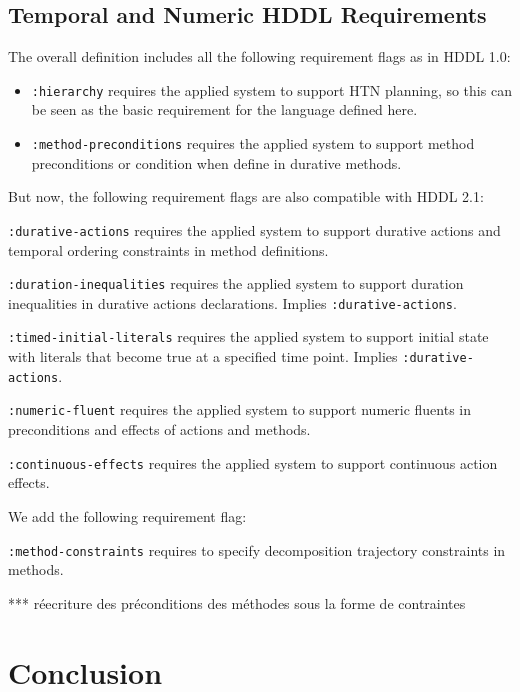 \documentclass[letterpaper]{article} %
\begin{document}
\subsection{Temporal and Numeric HDDL Requirements}
\label{Sec:Requirements}
The overall definition includes all the following requirement flags as in HDDL 1.0:
\begin{itemize}
 \item \verb+:hierarchy+ requires the applied system to support HTN planning, so this can be seen as the basic requirement for the language defined here.
 \item \verb+:method-preconditions+ requires the applied system to support method preconditions or condition when define in durative methods.
\end{itemize}
But now, the following requirement flags are also compatible with HDDL 2.1:
\begin{description}
 \item \verb+:durative-actions+ requires the applied system to support durative actions and temporal ordering constraints in method definitions.
 \item \verb+:duration-inequalities+ requires the applied system to support duration inequalities in durative actions declarations. Implies \verb+:durative-actions+.
 \item \verb+:timed-initial-literals+ requires the applied system to support initial state with literals that become true at a specified time point. Implies \verb+:durative-actions+.
 \item \verb+:numeric-fluent+ requires the applied system to support numeric fluents in preconditions and effects of actions and methods.
 \item \verb+:continuous-effects+ requires the applied system to support continuous action effects.
 \end{description}
 We add the following requirement flag:
\begin{description}
\item \verb+:method-constraints+ requires to specify decomposition trajectory constraints in methods. 
 \end{description}
 
 *** réecriture des préconditions des méthodes sous la forme de contraintes



\section{Conclusion}


\end{document}
